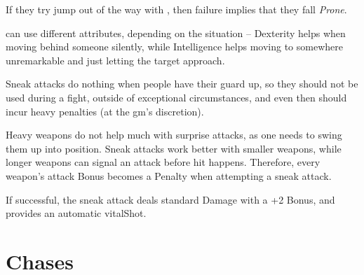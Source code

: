 \begin{multicols}{2}
If they try jump out of the way with , then failure implies that they fall \textit{Prone}.

\label{sneakattack}
can use different \glspl{attribute}, depending on the situation -- Dexterity helps when moving behind someone silently, while Intelligence helps moving to somewhere unremarkable and just letting the target approach.

Sneak attacks do nothing when people have their guard up, so they should not be used during a fight, outside of exceptional circumstances, and even then should incur heavy penalties (at the \gls{gm}'s discretion).

Heavy weapons do not help much with surprise attacks, as one needs to swing them up into position.
Sneak attacks work better with smaller weapons, while longer weapons can signal an attack before hit happens.
Therefore, every weapon's attack Bonus becomes a Penalty when attempting a sneak attack.

If successful, the sneak attack deals standard Damage with a +2 Bonus, and provides an automatic \gls{vitalShot}.

\stopcontents[Manoeuvres]

\end{multicols}

\section{Chases}
\label{chases}

\chasechart

